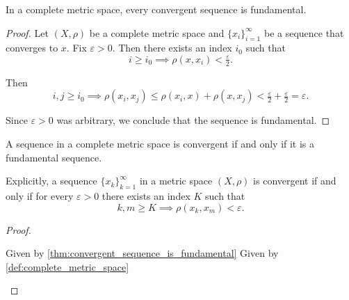 \begin{proposition}\label{thm:convergent_sequence_is_fundamental}
  In a complete metric space, every convergent sequence is fundamental.
\end{proposition}
\begin{proof}
  Let \( (X, \rho) \) be a complete metric space and \( \{ x_i \}_{i=1}^\infty \) be a sequence that converges to \( x \). Fix \( \varepsilon > 0 \). Then there exists an index \( i_0 \) such that
  \begin{equation*}
    i \geq i_0 \implies \rho(x, x_i) < \tfrac \varepsilon 2.
  \end{equation*}

  Then
  \begin{equation*}
    i, j \geq i_0 \implies \rho(x_i, x_j) \leq \rho(x_i, x) + \rho(x, x_j) < \tfrac \varepsilon 2 + \tfrac \varepsilon 2 = \varepsilon.
  \end{equation*}

  Since \( \varepsilon > 0 \) was arbitrary, we conclude that the sequence is fundamental.
\end{proof}

\begin{corollary}\label{thm:cauchys_convergence_criterion}
  A sequence in a complete metric space is convergent if and only if it is a fundamental sequence.

  Explicitly, a sequence \( \{ x_k \}_{k=1}^\infty \) in a metric space \( (X, \rho) \) is convergent if and only if for every \( \varepsilon > 0 \) there exists an index \( K \) such that
  \begin{equation*}
    k, m \geq K \implies \rho(x_k, x_m) < \varepsilon.
  \end{equation*}
\end{corollary}
\begin{proof}
  \begin{description}
    \Implies Given by \cref{thm:convergent_sequence_is_fundamental}
    \ImpliedBy Given by \cref{def:complete_metric_space}
  \end{description}
\end{proof}

